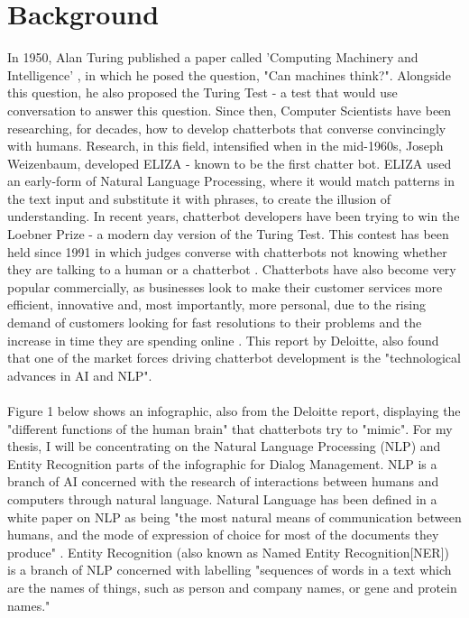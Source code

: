 %
%
\section*{Background}

In 1950, Alan Turing published a paper called 'Computing Machinery and Intelligence' \citep{turing-paper1950}, in which he posed the question, "Can machines think?". Alongside this question, he also proposed the Turing Test - a test that would use conversation to answer this question. Since then, Computer Scientists have been researching, for decades, how to develop chatterbots that converse convincingly with humans. Research, in this field, intensified when in the mid-1960s, Joseph Weizenbaum, developed ELIZA \citep{weizenbaum-eliza1966} - known to be the first chatter bot. ELIZA used an early-form of Natural Language Processing, where it would match patterns in the text input and substitute it with phrases, to create the illusion of understanding. In recent years, chatterbot developers have been trying to win the Loebner Prize - a modern day version of the Turing Test. This contest has been held since 1991 in which judges converse with chatterbots not knowing whether they are talking to a human or a chatterbot \citep{loebner-prize2001}. Chatterbots have also become very popular commercially, as businesses look to make their customer services more efficient, innovative and, most importantly, more personal, due to the rising demand of customers looking for fast resolutions to their problems and the increase in time they are spending online \citep{deloitte-chatbots2018}. This report by Deloitte, also found that one of the market forces driving chatterbot development is the "technological advances in AI and NLP".\\\\
Figure 1 below shows an infographic, also from the Deloitte report, displaying the "different functions of the human brain" that chatterbots try to "mimic". For my thesis, I will be concentrating on the Natural Language Processing (NLP) and Entity Recognition parts of the infographic for Dialog Management. NLP is a branch of AI concerned with the research of interactions between humans and computers through natural language. Natural Language has been defined in a white paper on NLP as being "the most natural means of communication between humans, and the mode of expression of choice for most of the documents they produce" \citep{nlp-whitepaper1989}. Entity Recognition (also known as Named Entity Recognition[NER]) is a branch of NLP concerned with labelling "sequences of words in a text which are the names of things, such as person and company names, or gene and protein names."  \citep{stanford-nlp-group}\\
